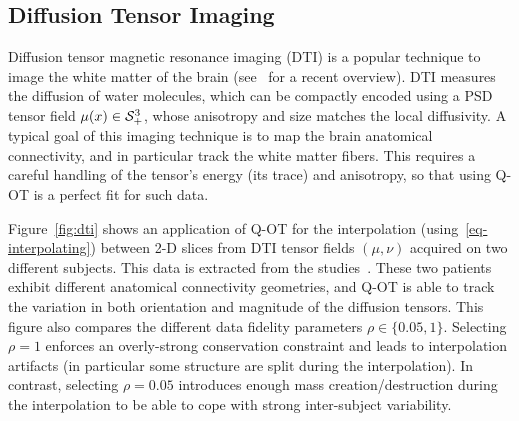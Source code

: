 



\subsection{Diffusion Tensor Imaging}

Diffusion tensor magnetic resonance imaging (DTI) is a popular technique to image the white matter of the brain (see~\cite{wandell2016clarifying} for a recent overview). DTI measures the diffusion of water molecules, which can be compactly encoded using a PSD tensor field $\mu(x) \in \mathcal{S}_+^3$, whose anisotropy and size matches the local diffusivity. 
%
A typical goal of this imaging technique is to map the brain anatomical connectivity, and in particular track the  white matter fibers. This requires a careful handling of the tensor's energy (its trace) and anisotropy, so that using Q-OT is a perfect fit for such data.

Figure~\ref{fig:dti} shows an application of Q-OT for the interpolation (using~\ref{eq-interpolating}) between 2-D slices from DTI tensor fields $(\mu,\nu)$ acquired on two different subjects. This data is extracted from the studies~\cite{pestilli2014evaluation,takemura2016ensemble}. These two patients exhibit different anatomical connectivity geometries, and Q-OT is able to track the variation in both orientation and magnitude of the diffusion tensors. This figure also compares the different data fidelity parameters $\rho \in \{0.05,1\}$. Selecting $\rho=1$ enforces an overly-strong conservation constraint and leads to interpolation artifacts (in particular some structure are split during the interpolation). In contrast, selecting $\rho=0.05$ introduces enough mass creation/destruction during the interpolation to be able to cope with strong inter-subject variability.

